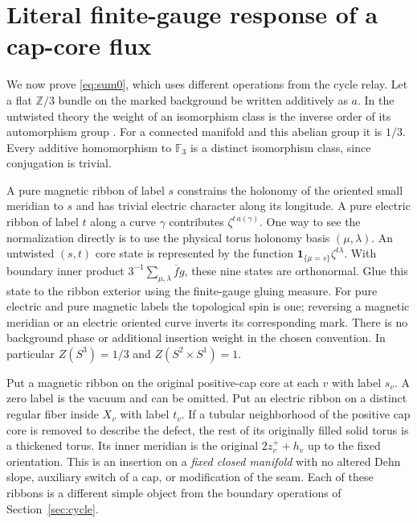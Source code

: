 \documentclass[11pt]{article}
\newcommand{\F}{\mathbb F_3}
\newcommand{\Z}{\mathbb Z}
\begin{document}
\section{Literal finite-gauge response of a cap-core flux}
\label{sec:response}

We now prove \eqref{eq:sum0}, which uses different operations from the cycle relay. Let a flat \(\Z/3\) bundle on the marked background be written additively as \(a\). In the untwisted theory the weight of an isomorphism class is the inverse order of its automorphism group \cite{fq,dw}. For a connected manifold and this abelian group it is \(1/3\). Every additive homomorphism to \(\F\) is a distinct isomorphism class, since conjugation is trivial.

A pure magnetic ribbon of label \(s\) constrains the holonomy of the oriented small meridian to \(s\) and has trivial electric character along its longitude. A pure electric ribbon of label \(t\) along a curve \(\gamma\) contributes \(\zeta^{t\,a(\gamma)}\). One way to see the normalization directly is to use the physical torus holonomy basis \((\mu,\lambda)\). An untwisted \((s,t)\) core state is represented by the function
\(\mathbf 1_{\{\mu=s\}}\zeta^{t\lambda}\). With boundary inner product \(3^{-1}\sum_{\mu,\lambda}\overline{f}g\), these nine states are orthonormal. Glue this state to the ribbon exterior using the finite-gauge gluing measure. For pure electric and pure magnetic labels the topological spin is one; reversing a magnetic meridian or an electric oriented curve inverts its corresponding mark. There is no background phase or additional insertion weight in the chosen convention. In particular \(Z(S^3)=1/3\) and \(Z(S^2\times S^1)=1\).

Put a magnetic ribbon on the original positive-cap core at each \(v\) with label \(s_v\). A zero label is the vacuum and can be omitted. Put an electric ribbon on a distinct regular fiber inside \(X_v\) with label \(t_v\). If a tubular neighborhood of the positive cap core is removed to describe the defect, the rest of its originally filled solid torus is a thickened torus. Its inner meridian is the original \(2z_v^++h_v\) up to the fixed orientation. This is an insertion on a \emph{fixed closed manifold} with no altered Dehn slope, auxiliary switch of a cap, or modification of the seam. Each of these ribbons is a different simple object from the boundary operations of Section~\ref{sec:cycle}.
\end{document}
